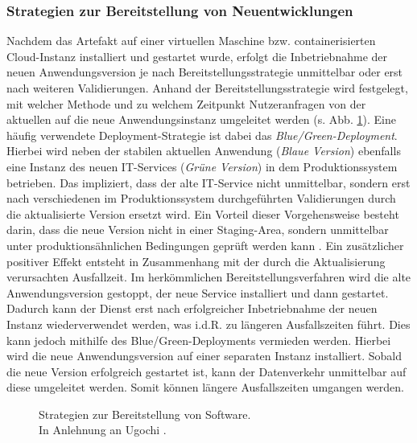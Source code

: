 \subsubsection{Strategien zur Bereitstellung von Neuentwicklungen}
\label{sec:Bereitstellungs_Strategien}
Nachdem das Artefakt auf einer virtuellen Maschine bzw. containerisierten Cloud-Instanz installiert und gestartet wurde, erfolgt die Inbetriebnahme der neuen Anwendungsversion je nach Bereitstellungsstrategie unmittelbar oder erst nach weiteren Validierungen. Anhand der Bereitstellungsstrategie wird festgelegt, mit welcher Methode und zu welchem Zeitpunkt Nutzeranfragen von der aktuellen auf die neue Anwendungsinstanz umgeleitet werden (s. Abb. \ref{fig:DS}).
Eine häufig verwendete Deployment-Strategie ist dabei das \textit{Blue/Green-Deployment}. Hierbei wird neben der stabilen aktuellen Anwendung (\textit{Blaue Version}) ebenfalls eine Instanz des neuen IT-Services (\textit{Grüne Version}) in dem Produktionssystem betrieben. Das impliziert, dass der alte IT-Service nicht unmittelbar, sondern erst nach verschiedenen im Produktionssystem durchgeführten Validierungen durch die aktualisierte Version ersetzt wird. Ein Vorteil dieser Vorgehensweise besteht darin, dass die neue Version nicht in einer Staging-Area, sondern unmittelbar unter produktionsähnlichen Bedingungen geprüft werden kann \cite{Ugochi.20220503}. Ein zusätzlicher positiver Effekt entsteht in Zusammenhang mit der durch die Aktualisierung verursachten Ausfallzeit. Im herkömmlichen Bereitstellungsverfahren wird die alte Anwendungsversion gestoppt, der neue Service installiert und dann gestartet. Dadurch kann der Dienst erst nach erfolgreicher Inbetriebnahme der neuen Instanz wiederverwendet werden, was i.d.R. zu längeren Ausfallszeiten führt. Dies kann jedoch mithilfe des Blue/Green-Deployments vermieden werden. Hierbei wird die neue Anwendungsversion  auf einer separaten Instanz installiert. Sobald die neue Version erfolgreich gestartet ist, kann der Datenverkehr unmittelbar auf diese umgeleitet werden. Somit können längere Ausfallszeiten umgangen werden. 
\begin{center}
	\begin{figure}[H]
		\centering
		\caption[Strategien zur Bereitstellung von Software]{Strategien zur Bereitstellung von Software.\\ In Anlehnung an Ugochi \cite{Ugochi.20220503}.}
		\label{fig:DS}
	\end{figure}
\end{center}
